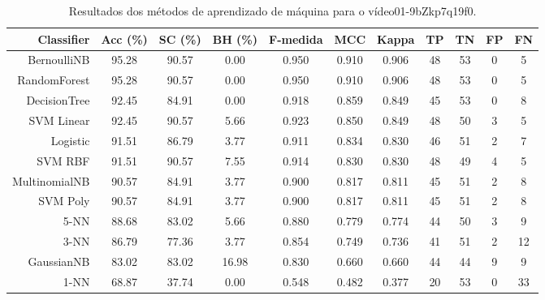 \begin{table}[!htb]
\centering
\caption{Resultados dos métodos de aprendizado de máquina para o vídeo01-9bZkp7q19f0.}
\label{tab:01-9bZkp7q19f0}
\begin{tabular}{r|c|c|c|c|c|c|c|c|c|c}
\hline\hline
Classifier & Acc (\%) & SC (\%) & BH (\%) & F-medida & MCC & Kappa & TP & TN & FP & FN \\ \hline
BernoulliNB & 95.28 & 90.57 & 0.00 & 0.950 & 0.910 & 0.906 & 48 & 53 & 0 & 5 \\ 
RandomForest & 95.28 & 90.57 & 0.00 & 0.950 & 0.910 & 0.906 & 48 & 53 & 0 & 5 \\ 
DecisionTree & 92.45 & 84.91 & 0.00 & 0.918 & 0.859 & 0.849 & 45 & 53 & 0 & 8 \\ 
SVM Linear & 92.45 & 90.57 & 5.66 & 0.923 & 0.850 & 0.849 & 48 & 50 & 3 & 5 \\ 
Logistic & 91.51 & 86.79 & 3.77 & 0.911 & 0.834 & 0.830 & 46 & 51 & 2 & 7 \\ 
SVM RBF & 91.51 & 90.57 & 7.55 & 0.914 & 0.830 & 0.830 & 48 & 49 & 4 & 5 \\ 
MultinomialNB & 90.57 & 84.91 & 3.77 & 0.900 & 0.817 & 0.811 & 45 & 51 & 2 & 8 \\ 
SVM Poly & 90.57 & 84.91 & 3.77 & 0.900 & 0.817 & 0.811 & 45 & 51 & 2 & 8 \\ 
5-NN & 88.68 & 83.02 & 5.66 & 0.880 & 0.779 & 0.774 & 44 & 50 & 3 & 9 \\ 
3-NN & 86.79 & 77.36 & 3.77 & 0.854 & 0.749 & 0.736 & 41 & 51 & 2 & 12 \\ 
GaussianNB & 83.02 & 83.02 & 16.98 & 0.830 & 0.660 & 0.660 & 44 & 44 & 9 & 9 \\ 
1-NN & 68.87 & 37.74 & 0.00 & 0.548 & 0.482 & 0.377 & 20 & 53 & 0 & 33 \\ 
\hline\hline
\end{tabular}
\end{table}
